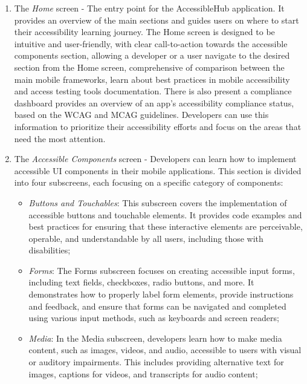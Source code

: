 \begin{enumerate}
    \item The \textit{Home} screen - The entry point for the AccessibleHub application. It provides an overview of the main sections and guides users on where to start their accessibility learning journey. The Home screen is designed to be intuitive and user-friendly, with clear call-to-action towards the accessible components section, allowing a developer or a user navigate to the desired section from the Home screen, comprehensive of comparison between the main mobile frameworks, learn about best practices in mobile accessibility and access testing tools documentation. There is also present a compliance dashboard provides an overview of an app's accessibility compliance status, based on the WCAG and MCAG guidelines. Developers can use this information to prioritize their accessibility efforts and focus on the areas that need the most attention.

    \item The \textit{Accessible Components} screen - Developers can learn how to implement accessible UI components in their mobile applications. This section is divided into four subscreens, each focusing on a specific category of components:

    \begin{itemize}
        \item \textit{Buttons and Touchables}: This subscreen covers the implementation of accessible buttons and touchable elements. It provides code examples and best practices for ensuring that these interactive elements are perceivable, operable, and understandable by all users, including those with disabilities;

        \item \textit{Forms}: The Forms subscreen focuses on creating accessible input forms, including text fields, checkboxes, radio buttons, and more. It demonstrates how to properly label form elements, provide instructions and feedback, and ensure that forms can be navigated and completed using various input methods, such as keyboards and screen readers;

        \item \textit{Media}: In the Media subscreen, developers learn how to make media content, such as images, videos, and audio, accessible to users with visual or auditory impairments. This includes providing alternative text for images, captions for videos, and transcripts for audio content;


\end{itemize}
\end{enumerate}
